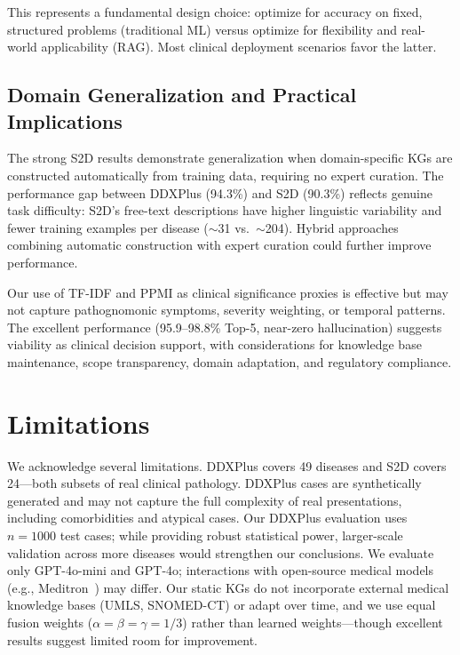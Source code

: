\documentclass[preprint,12pt]{elsarticle}
\begin{document}
This represents a fundamental design choice: optimize for accuracy on fixed, structured problems (traditional ML) versus optimize for flexibility and real-world applicability (RAG). Most clinical deployment scenarios favor the latter.

\subsection{Domain Generalization and Practical Implications}

The strong S2D results demonstrate generalization when domain-specific KGs are constructed automatically from training data, requiring no expert curation. The performance gap between DDXPlus (94.3\%) and S2D (90.3\%) reflects genuine task difficulty: S2D's free-text descriptions have higher linguistic variability and fewer training examples per disease (${\sim}$31 vs.\ ${\sim}$204). Hybrid approaches combining automatic construction with expert curation could further improve performance.

Our use of TF-IDF and PPMI as clinical significance proxies is effective but may not capture pathognomonic symptoms, severity weighting, or temporal patterns. The excellent performance (95.9--98.8\% Top-5, near-zero hallucination) suggests viability as clinical decision support, with considerations for knowledge base maintenance, scope transparency, domain adaptation, and regulatory compliance.

\section{Limitations}
\label{sec:limitations}

We acknowledge several limitations. DDXPlus covers 49 diseases and S2D covers 24---both subsets of real clinical pathology. DDXPlus cases are synthetically generated and may not capture the full complexity of real presentations, including comorbidities and atypical cases. Our DDXPlus evaluation uses $n{=}1000$ test cases; while providing robust statistical power, larger-scale validation across more diseases would strengthen our conclusions. We evaluate only GPT-4o-mini and GPT-4o; interactions with open-source medical models (e.g., Meditron~\cite{chen2023meditron}) may differ. Our static KGs do not incorporate external medical knowledge bases (UMLS, SNOMED-CT) or adapt over time, and we use equal fusion weights ($\alpha{=}\beta{=}\gamma{=}1/3$) rather than learned weights---though excellent results suggest limited room for improvement.
\end{document}

